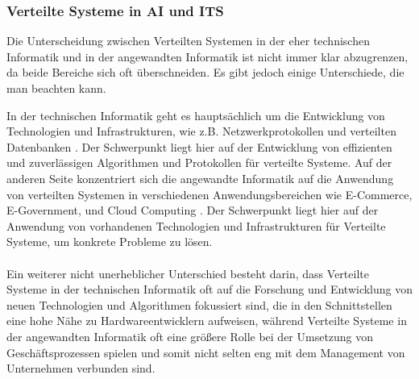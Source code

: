 \documentclass[../vs-script-first-v01.tex]{subfiles}
\begin{document}
\subsubsection{Verteilte Systeme in AI und ITS}

Die Unterscheidung zwischen Verteilten Systemen in der eher technischen Informatik und in der angewandten Informatik ist nicht immer klar abzugrenzen, da beide Bereiche sich oft überschneiden. Es gibt jedoch einige Unterschiede, die man beachten kann.

In der technischen Informatik geht es hauptsächlich um die Entwicklung von Technologien und Infrastrukturen, wie z.B. Netzwerkprotokollen und verteilten Datenbanken \cite{coulouris2012distributed}. Der Schwerpunkt liegt hier auf der Entwicklung von effizienten und zuverlässigen Algorithmen und Protokollen für verteilte Systeme. Auf der anderen Seite konzentriert sich die angewandte Informatik auf die Anwendung von verteilten Systemen in verschiedenen Anwendungsbereichen wie E-Commerce, E-Government, und Cloud Computing \cite{ghosh2012distributed}. Der Schwerpunkt liegt hier auf der Anwendung von vorhandenen Technologien und Infrastrukturen für Verteilte Systeme, um konkrete Probleme zu lösen.
\\\\
Ein weiterer nicht unerheblicher Unterschied besteht darin, dass Verteilte Systeme in der technischen Informatik oft auf die Forschung und Entwicklung von neuen Technologien und Algorithmen fokussiert sind, die in den Schnittstellen eine hohe Nähe zu Hardwareentwicklern aufweisen, während Verteilte Systeme in der angewandten Informatik oft eine größere Rolle bei der Umsetzung von Geschäftsprozessen spielen und somit nicht selten eng mit dem Management von Unternehmen verbunden sind\cite{birman2012guide}.
\end{document}
